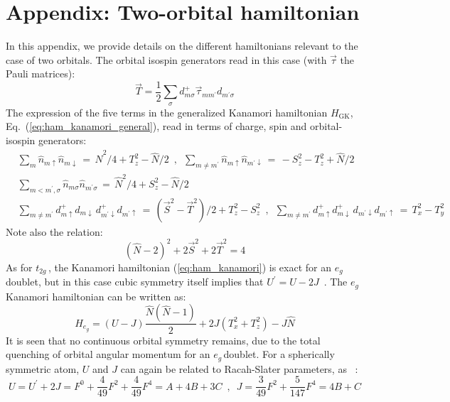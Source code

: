 \documentclass[]{ar2e-changed}%
\def\Up{U^\prime}
\def\hn{\hat{n}}
\def\hN{\hat{N}}
\def\hnmu{\hat{n}_{m\uparrow}}
\def\hnmd{\hat{n}_{m\downarrow}}
\def\hnpmd{\hat{n}_{m^\prime\downarrow}}
\def\spinup{\uparrow}
\def\spindown{\downarrow}
\def\mp{m^\prime}
\def\ttg{$t_{2g}\,$}
\def\eg{$e_{g}\,$}
\begin{document}
\appendix
\section{Appendix: Two-orbital hamiltonian}
\label{sec:appendix}
\begin{small}

In this appendix, we provide details on the different hamiltonians relevant to the case of two orbitals. 
%
The orbital isospin generators read in this case (with $\vec{\tau}$ the Pauli matrices):
\begin{equation} 
\vec{T}=\frac{1}{2}\sum_\sigma d^+_{m\sigma}\vec{\tau}_{m\mp}d_{\mp\sigma}
\end{equation}
The expression of the five terms in the generalized Kanamori hamiltonian $H_{\mathrm{GK}}$, Eq.~(\ref{eq:ham_kanamori_general}), 
read in terms of charge, spin and orbital-isospin generators: 
\begin{eqnarray} \nonumber 
&\sum_m \hnmu\hnmd\,=\,
\hN^2/4+T_z^2-\hN/2\,\,\,,\,\,\,
\sum_{m\neq\mp} \hnmu\hnpmd\,=\,
-S_z^2-T_z^2+\hN/2 \\
&\sum_{m<\mp,\sigma} \hn_{m\sigma}\hn_{\mp\sigma}\,=\,
\hN^2/4+S_z^2-\hN/2 \\
&\sum_{m\neq\mp} d^+_{m\spinup}d_{m\spindown}\,d^+_{\mp\spindown}d_{\mp\spinup}\,=\,
(\vec{S}^2-\vec{T}^2)/2+T_z^2-S_z^2 \,\,\,,\,\,\,
\sum_{m\neq\mp} d^+_{m\spinup}d^+_{m\spindown}\,d_{\mp\spindown}d_{\mp\spinup} \,=\,T_x^2-T_y^2  \nonumber
\end{eqnarray}
Note also the relation: 
\begin{equation}
(\hN-2)^2+2\vec{S}^2+2\vec{T}^2=4
\end{equation}
%
As for \ttg, the Kanamori hamiltonian (\ref{eq:ham_kanamori}) is exact for an \eg doublet, but 
in this case cubic symmetry itself implies that $\Up=U-2J$~\cite{sugano_multiplets_book}. 
%
The \eg Kanamori hamiltonian can be written as:
\begin{equation}
H_{e_g} = (U-J)\frac{\hN(\hN-1)}{2} + 2J(T_x^2+T_z^2)  -J \hN
\label{eq:ham_eg}
\end{equation}
It is seen that no continuous orbital symmetry remains, due to the total quenching of orbital 
angular momentum for an \eg doublet. For a spherically symmetric atom, $U$ and $J$ can again be related to 
Racah-Slater parameters, as~\cite{sugano_multiplets_book} :
\begin{equation}
U=\Up+2J=F^0+\frac{4}{49}F^2+\frac{4}{49}F^4=A+4B+3C\,\,\,,\,\,\,
J=\frac{3}{49}F^2+\frac{5}{147}F^4=4B+C

\end{equation}
\end{small}
\end{document}
